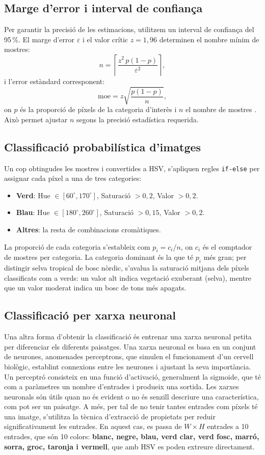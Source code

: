\documentclass{ieeetj}
\begin{document}
\subsection{Marge d’error i interval de confiança}
Per garantir la precisió de les estimacions, utilitzem un interval de confiança del 95\,\%. El marge d’error \(\varepsilon\) i el valor crític \(z=1{,}96\) determinen el nombre mínim de mostres:
\[
  n = \left\lceil\frac{z^2\,p(1-p)}{\varepsilon^2}\right\rceil,
\]
i l’error estàndard corresponent:
\[
  \mathrm{moe} = z\sqrt{\frac{p(1-p)}{n}},
\]
on \(p\) és la proporció de píxels de la categoria d’interès i \(n\) el nombre de mostres \cite{hammersley1964}. Això permet ajustar \(n\) segons la precisió estadística requerida.

\subsection{Classificació probabilística d’imatges}
Un cop obtingudes les mostres i convertides a HSV, s’apliquen regles \texttt{if-else} per assignar cada píxel a una de tres categories:
\begin{itemize}
  \item \textbf{Verd}: Hue \(\in[60^\circ,170^\circ]\), Saturació \(>0{,}2\), Valor \(>0{,}2\).
  \item \textbf{Blau}: Hue \(\in[180^\circ,260^\circ]\), Saturació \(>0{,}15\), Valor \(>0{,}2\).
  \item \textbf{Altres}: la resta de combinacions cromàtiques.
\end{itemize}
La proporció de cada categoria s’estableix com \(p_i = c_i / n\), on \(c_i\) és el comptador de mostres per categoria. La categoria dominant és la que té \(p_i\) més gran; per distingir selva tropical de bosc nòrdic, s’avalua la saturació mitjana dels píxels classificats com a verds: un valor alt indica vegetació exuberant (selva), mentre que un valor moderat indica un bosc de tons més apagats.


\subsection{Classificació per xarxa neuronal}
Una altra forma d'obtenir la classificació és entrenar una xarxa neuronal petita per diferenciar els diferents paisatges.  
Una xarxa neuronal \cite{ann} es basa en un conjunt de neurones, anomenades perceptrons, que simulen el funcionament d'un cervell biològic, establint connexions entre les neurones i ajustant la seva importància.  
Un perceptró consisteix en una funció d'activació, generalment la sigmoide, que té com a paràmetres un nombre d'entrades i produeix una sortida.  
Les xarxes neuronals són útils quan no és evident o no és senzill descriure una característica, com pot ser un paisatge. A més, per tal de no tenir tantes entrades com píxels té una imatge, s'utilitza la tècnica d'extracció de propietats per reduir significativament les entrades. En aquest cas, es passa de $W \times H$ entrades a 10 entrades, que són 10 colors: \textbf{blanc, negre, blau, verd clar, verd fosc, marró, sorra, groc, taronja i vermell}, que amb HSV es poden extreure directament.
\end{document}
